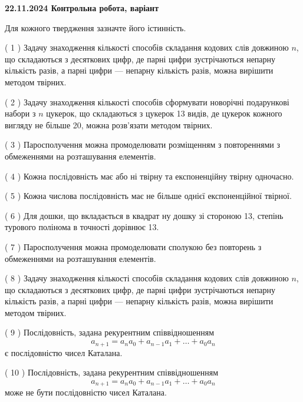 \documentclass[12pt, ukrainian]{article}
\begin{document}
\vspace{4mm}
\newpage
\begin {large}

\textbf{22.11.2024 Контрольна робота, варіант  }\par


{
Для кожного твердження зазначте його істинність.\par
\vspace{2mm}
( 1 ) Задачу знаходження кількості способів складання кодових слів довжиною $n$, що складаються з десяткових цифр, де парні цифри зустрічаються непарну кількість разів, а парні цифри — непарну кількість разів, можна вирішити методом твірних.%

( 2 ) Задачу знаходження кількості способів сформувати новорічні подарункові набори з $n$ цукерок, що складаються з цукерок 13 видів, де цукерок кожного вигляду не більше 20, можна розв’язати методом твірних.%

( 3 ) Паросполучення можна промоделювати розміщенням з повтореннями з обмеженнями на розташування елементів.%

( 4 ) Кожна послідовність має або ні твірну та експоненційну твірну одночасно.%

( 5 ) Кожна числова послідовність має не більше однієї  експоненційної твірної.%

( 6 ) Для дошки, що вкладається в квадрат ну дошку зі стороною 13, степінь турового полінома в точності дорівнює 13.%

( 7 ) Паросполучення можна промоделювати сполукою без повторень з обмеженнями на розташування елементів.%

( 8 ) Задачу знаходження кількості способів складання кодових слів довжиною $n$, що складаються з десяткових цифр, де парні цифри зустрічаються непарну кількість разів, а парні цифри — непарну кількість разів, можна вирішити методом твірних.%

( 9 ) Послідовність, задана рекурентним співвідношенням $$a_{n+1}=a_{n}a_{0}+a_{n-1}a_{1}+\ldots+a_0a_{n}$$ є послідовністю чисел Каталана.%

( 10 ) Послідовність, задана рекурентним співвідношенням $$a_{n+1}=a_{n}a_{0}+a_{n-1}a_{1}+\ldots+a_0a_{n}$$ може не бути послідовністю чисел Каталана.%


\vspace{5mm}
}
\end {large}
\end{document}
